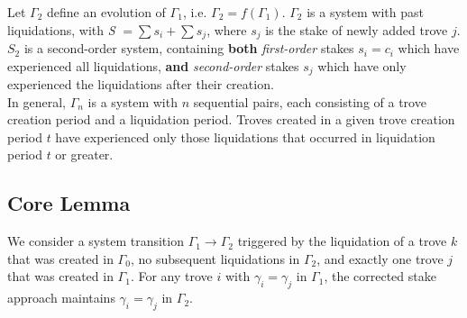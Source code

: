 \documentclass[reqno]{article}
\begin{document}
Let $\Gamma_2$ define an evolution of $\Gamma_1$, i.e. $\Gamma_2 = f(\Gamma_1)$. $\Gamma_2$ is a system with past liquidations, with \textit{S} $= \sum s_i + \sum s_j$, where $s_j$ is the stake of newly added trove $j$. $S_2$ is a second-order system, containing \textbf{both} \textit{first-order} stakes $s_i = c_i$ which have experienced all liquidations, \textbf{and} \textit{second-order} stakes $s_j$ which have only experienced the liquidations after their creation.\\

In general, $\Gamma_n$ is a system with $n$ sequential pairs, each consisting of a trove creation period and a liquidation period. Troves created in a given trove creation period $t$ have experienced only those liquidations that occurred in liquidation period $t$ or greater.


\subsection*{Core Lemma}
We consider a system transition $\Gamma_1 \rightarrow \Gamma_2$ triggered by the liquidation of a trove $k$ that was created in $\Gamma_0$, no subsequent liquidations in $\Gamma_2$, and exactly one trove $j$ that was created in $\Gamma_1$. For any trove $i$ with $\gamma_i = \gamma_j$ in $\Gamma_1$, the corrected stake approach maintains $\gamma_i = \gamma_j$ in $\Gamma_2$.


\end{document}
